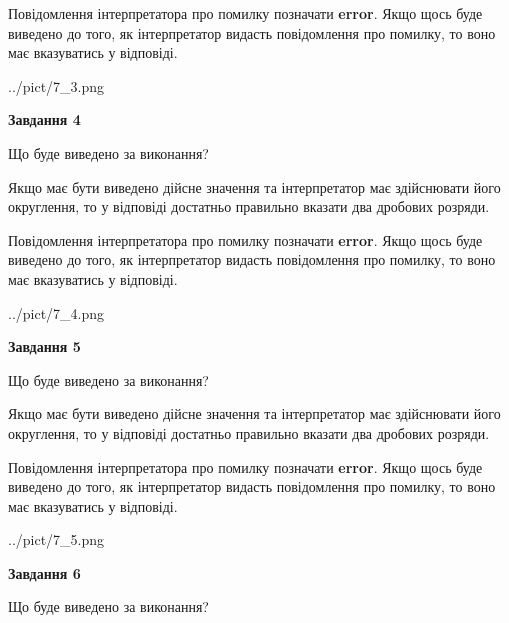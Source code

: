 \documentclass[12pt, ukrainian]{article}
\begin{document}
{\begin {Large}
Повідомлення інтерпретатора про помилку позначати \textbf{error}.
Якщо щось буде виведено до того, як інтерпретатор видасть повідомлення про помилку, 
то воно має вказуватись у відповіді. \par

\begin{center}
	{../pict/7_3.png}
\end{center}
\newpage

{\begin {center}\textbf{Завдання 4}\end {center}}\par
Що буде виведено за виконання? \par

Якщо має бути виведено дійсне значення та інтерпретатор має здійснювати його округлення, 
то у відповіді достатньо правильно вказати два дробових розряди.

Повідомлення інтерпретатора про помилку позначати \textbf{error}.
Якщо щось буде виведено до того, як інтерпретатор видасть повідомлення про помилку, 
то воно має вказуватись у відповіді. \par

\begin{center}
	{../pict/7_4.png}
\end{center}
\newpage

{\begin {center}\textbf{Завдання 5}\end {center}}\par
Що буде виведено за виконання? \par

Якщо має бути виведено дійсне значення та інтерпретатор має здійснювати його округлення, 
то у відповіді достатньо правильно вказати два дробових розряди.

Повідомлення інтерпретатора про помилку позначати \textbf{error}.
Якщо щось буде виведено до того, як інтерпретатор видасть повідомлення про помилку, 
то воно має вказуватись у відповіді. \par

\begin{center}
	{../pict/7_5.png}
\end{center}
\newpage

{\begin {center}\textbf{Завдання 6}\end {center}}\par
Що буде виведено за виконання? \par


\end{Large}}
\end{document}
